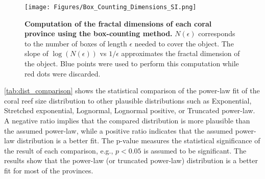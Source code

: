 \begin{figure}[H]
    \centering
    \texttt{[image: Figures/Box\_Counting\_Dimensions\_SI.png]}
    \caption[Computation of the fractal dimensions of each coral province
        using the box-counting method]{\textbf{Computation of the fractal
            dimensions of each coral province
            using the box-counting method.} $N(\epsilon)$ corresponds to the
        number
        of boxes
        of length $\epsilon$ needed to cover the object. The slope of
        $\log(N(\epsilon))$ vs $1/\epsilon$ approximates the fractal dimension
        of the
        object. Blue points were used to perform this computation while red
        dots were
        discarded.}
    \label{fig:Box_Counting_SI}
\end{figure}

\cref{tab:dist_comparison} shows the statistical comparison of the power-law
fit of the coral reef size distribution to other plausible distributions such
as Exponential, Stretched exponential, Lognormal, Lognormal positive, or
Truncated power-law. A negative ratio implies that the compared distribution is
more plausible than the assumed power-law, while a positive ratio indicates
that the assumed power-law distribution is a better fit. The p-value measures
the statistical significance of the result of each comparison, e.g., $p<0.05$
is assumed to be significant. The results show that the power-law (or truncated
power-law) distribution is a better fit for most of the provinces.

